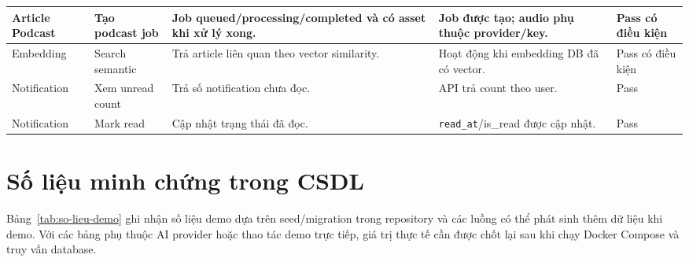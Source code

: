 \documentclass[14pt,a4paper,oneside]{extreport}
\begin{document}
\begin{longtable}{|p{2.8cm}|p{4.0cm}|p{4.3cm}|p{3.0cm}|p{1.6cm}|}
\hline
Article Podcast & Tạo podcast job & Job queued/processing/completed và có asset khi xử lý xong. & Job được tạo; audio phụ thuộc provider/key. & Pass có điều kiện \\
\hline
Embedding & Search semantic & Trả article liên quan theo vector similarity. & Hoạt động khi embedding DB đã có vector. & Pass có điều kiện \\
\hline
Notification & Xem unread count & Trả số notification chưa đọc. & API trả count theo user. & Pass \\
\hline
Notification & Mark read & Cập nhật trạng thái đã đọc. & \texttt{read\_at}/is\_read được cập nhật. & Pass \\
\hline
\end{longtable}

\section{Số liệu minh chứng trong CSDL}
\label{sec:so-lieu-minh-chung}

Bảng~\ref{tab:so-lieu-demo} ghi nhận số liệu demo dựa trên seed/migration trong repository và các luồng có thể phát sinh thêm dữ liệu khi demo. Với các bảng phụ thuộc AI provider hoặc thao tác demo trực tiếp, giá trị thực tế cần được chốt lại sau khi chạy Docker Compose và truy vấn database.
\end{document}
